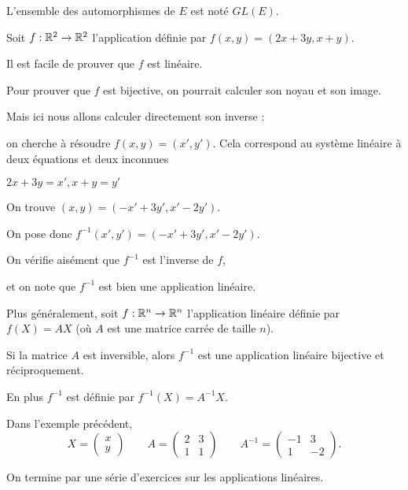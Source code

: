    L'ensemble des automorphismes de $E$ est noté $GL(E)$.


\diapo

Soit $f : \mathbb{R}^2 \to \mathbb{R}^2$ l'application définie par $f(x,y)=(2x+3y,x+y)$.

\change

Il est facile de prouver que $f$ est linéaire. 

\change

Pour prouver que $f$ est bijective, on pourrait calculer son noyau et son image.

\change

Mais ici nous allons calculer directement son inverse : 

\change

on cherche à résoudre $f(x,y)=(x',y')$. Cela correspond au 
système linéaire à deux équations et deux inconnues


$2x+3y=x', x+y=y'$

\change

On trouve $(x,y) = (-x'+3y',x'-2y')$.

\change

On pose donc $f^{-1}(x',y')= (-x'+3y',x'-2y')$.

\change

On vérifie aisément que $f^{-1}$ est l'inverse de $f$, 

\change

et on note que $f^{-1}$ est bien une application linéaire.


\change


Plus généralement, soit  $f : \mathbb{R}^n \to \mathbb{R}^n$ l'application linéaire
définie par $f(X)=AX$ (où $A$ est une matrice carrée de taille $n$).

\change


Si la matrice $A$ est inversible, alors $f^{-1}$ est une application linéaire bijective 
et réciproquement.

\change

En plus $f^{-1}$ est définie par $f^{-1}(X)= A^{-1} X$.

\change

Dans l'exemple précédent, 
$$X = \begin{pmatrix} x \\ y \end{pmatrix} \qquad 
A = \begin{pmatrix} 2 & 3 \\ 1 & 1 \end{pmatrix} \qquad 
A^{-1} = \begin{pmatrix} -1 & 3 \\ 1 & -2 \end{pmatrix}.$$


\diapo

On termine par une série d'exercices sur les applications linéaires.


